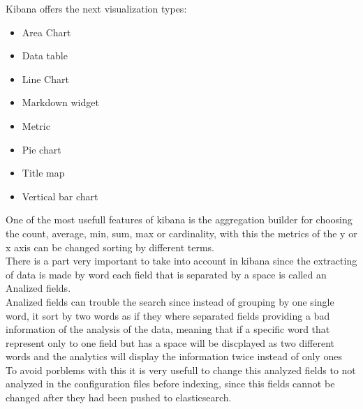 Kibana offers the next visualization types:
\begin{itemize}
\item Area Chart
\item Data table
\item Line Chart
\item Markdown widget
\item Metric
\item Pie chart
\item Title map
\item Vertical bar chart
\end{itemize}

One of the most usefull features of kibana is the aggregation builder for choosing the count, average, min, sum, max or cardinality, with this the metrics of the y or x axis can be changed sorting by different terms.
\\

There is a part very important to take into account in kibana since the extracting of data is made by word each field that is separated by a space is called an Analized fields. 
\\

Analized fields can trouble the search since instead of grouping by one single word, it sort by two words as if they where separated fields providing a bad information of the analysis of the data, meaning that if a specific word that represent only to one field but has a space will be discplayed as two different words and the analytics will display the information twice instead of only ones
\\

To avoid porblems with this it is very usefull to change this analyzed fields to not analyzed in the configuration files before indexing, since this fields cannot be changed after they had been pushed to elasticsearch.
